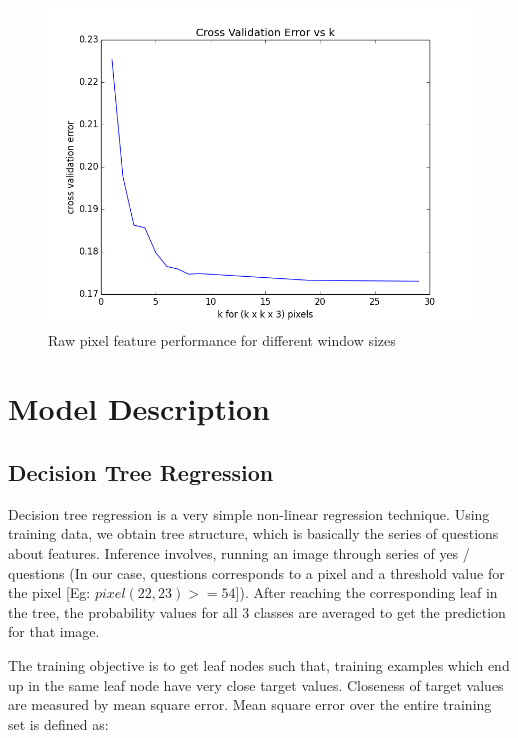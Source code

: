 \documentclass[10pt]{article}
\begin{document}
\begin{figure}[h]
\begin{center}
\includegraphics[scale=0.4]{images/find_k_cv.jpg}
\caption{Raw pixel feature performance for different window sizes}
\end{center}
\label{fig:raweval}
\end{figure}

\section*{Model Description}

\subsection*{Decision Tree Regression}
Decision tree regression is a very simple non-linear regression technique. Using training data, we obtain tree structure, which is basically the series of questions about features. Inference involves, running an image through series of yes / questions (In our case, questions corresponds to a pixel and a threshold value for the pixel [Eg: $pixel(22, 23) >= 54$]). After reaching the corresponding leaf in the tree, the probability values for all 3 classes are averaged to get the prediction for that image.   

The training objective is to get leaf nodes such that, training examples which end up in the same leaf node have very close target values. Closeness of target values are measured by mean square error. Mean square error over the entire training set is defined as:
\end{document}
